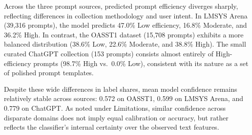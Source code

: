 Across the three prompt sources, predicted prompt efficiency diverges sharply, reflecting differences in collection methodology and user intent. In LMSYS Arena (39,316 prompts), the model predicts 47.0\% Low efficiency, 16.8\% Moderate, and 36.2\% High. In contrast, the OASST1 dataset (15,708 prompts) exhibits a more balanced distribution (38.6\% Low, 22.6\% Moderate, and 38.8\% High). The small curated ChatGPT collection (153 prompts) consists almost entirely of High-efficiency prompts (98.7\% High vs.\ 0.0\% Low), consistent with its nature as a set of polished prompt templates.

Despite these wide differences in label shares, mean model confidence remains relatively stable across sources: 0.572 on OASST1, 0.599 on LMSYS Arena, and 0.779 on ChatGPT. As noted under Limitations, similar confidence across disparate domains does not imply equal calibration or accuracy, but rather reflects the classifier's internal certainty over the observed text features.